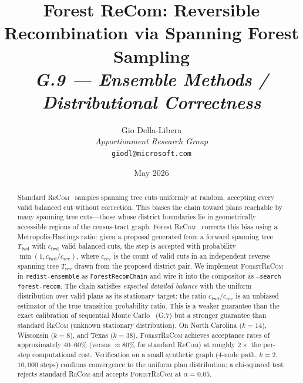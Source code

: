 \documentclass[12pt]{article}
\title{%
  \textbf{Forest ReCom: Reversible Recombination via Spanning Forest Sampling}\\[0.8em]
  \normalsize\textit{G.9 --- Ensemble Methods / Distributional Correctness}%
}
\author{%
  Gio Della-Libera\\
  \textit{Apportionment Research Group}\\
  \small\texttt{giodl@microsoft.com}
}
\date{May 2026}
\newcommand{\fr}{\textsc{ForestReCom}}
\newcommand{\recom}{\textsc{ReCom}}
\begin{document}
\maketitle

\begin{abstract}
\noindent
Standard \recom{}~\citep{deford2021} samples spanning tree cuts uniformly at
random, accepting every valid balanced cut without correction.
This biases the chain toward plans reachable by many spanning tree cuts---those
whose district boundaries lie in geometrically accessible regions of the
census-tract graph.
Forest \recom{}~\citep{mccartan2020} corrects this bias using a
Metropolis-Hastings ratio: given a proposal generated from a forward spanning
tree $T_{\mathrm{fwd}}$ with $c_{\mathrm{fwd}}$ valid balanced cuts, the
step is accepted with probability $\min(1, c_{\mathrm{fwd}} / c_{\mathrm{rev}})$,
where $c_{\mathrm{rev}}$ is the count of valid cuts in an independent
reverse spanning tree $T_{\mathrm{rev}}$ drawn from the proposed district pair.
We implement \fr{} in \texttt{redist-ensemble} as \texttt{ForestRecomChain}
and wire it into the compositor as \texttt{--search forest-recom}.
The chain satisfies \emph{expected detailed balance} with the uniform
distribution over valid plans as its stationary target: the ratio
$c_{\mathrm{fwd}} / c_{\mathrm{rev}}$ is an unbiased estimator of the
true transition probability ratio.
This is a weaker guarantee than the exact calibration of sequential Monte
Carlo~\citep{dellaLibera2026smc} (G.7) but a stronger guarantee than standard
\recom{} (unknown stationary distribution).
On North Carolina ($k = 14$), Wisconsin ($k = 8$), and Texas ($k = 38$), \fr{}
achieves acceptance rates of approximately $40$--$60\%$ (versus $\approx\!80\%$
for standard \recom{}) at roughly $2\times$ the per-step computational cost.
Verification on a small synthetic graph (4-node path, $k = 2$, $10{,}000$
steps) confirms convergence to the uniform plan distribution; a chi-squared
test rejects standard \recom{} and accepts \fr{} at $\alpha = 0.05$.
\end{abstract}

\tableofcontents
\newpage










\end{document}
